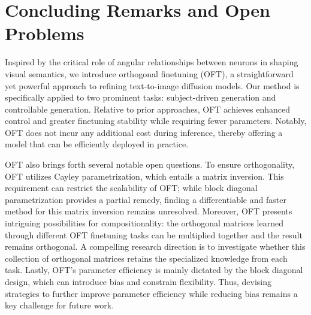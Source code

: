 \section{Concluding Remarks and Open Problems}

Inspired by the critical role of angular relationships between neurons in shaping visual semantics, we introduce orthogonal finetuning (OFT), a straightforward yet powerful approach to refining text-to-image diffusion models. Our method is specifically applied to two prominent tasks: subject-driven generation and controllable generation. Relative to prior approaches, OFT achieves enhanced control and greater finetuning stability while requiring fewer parameters. Notably, OFT does not incur any additional cost during inference, thereby offering a model that can be efficiently deployed in practice.

OFT also brings forth several notable open questions. To ensure orthogonality, OFT utilizes Cayley parametrization, which entails a matrix inversion. This requirement can restrict the scalability of OFT; while block diagonal parametrization provides a partial remedy, finding a differentiable and faster method for this matrix inversion remains unresolved. Moreover, OFT presents intriguing possibilities for compositionality: the orthogonal matrices learned through different OFT finetuning tasks can be multiplied together and the result remains orthogonal. A compelling research direction is to investigate whether this collection of orthogonal matrices retains the specialized knowledge from each task. Lastly, OFT's parameter efficiency is mainly dictated by the block diagonal design, which can introduce bias and constrain flexibility. Thus, devising strategies to further improve parameter efficiency while reducing bias remains a key challenge for future work.

